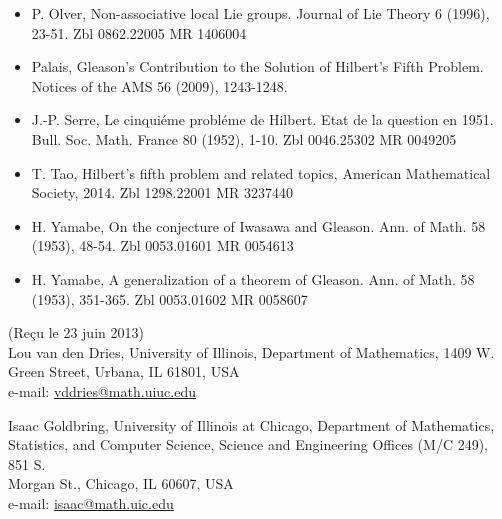 \documentclass[10pt]{article}
\begin{document}
\begin{itemize}
  \item[] [17] P. Olver, Non-associative local Lie groups. Journal of Lie Theory 6 (1996), 23-51. Zbl 0862.22005 MR 1406004
  \item[] [18] Palais, Gleason's Contribution to the Solution of Hilbert's Fifth Problem. Notices of the AMS 56 (2009), 1243-1248.
  \item[] [19] J.-P. Serre, Le cinquiéme probléme de Hilbert. Etat de la question en 1951. Bull. Soc. Math. France 80 (1952), 1-10. Zbl 0046.25302 MR 0049205
  \item[] [20] T. Tao, Hilbert's fifth problem and related topics, American Mathematical Society, 2014. Zbl 1298.22001 MR 3237440
  \item[] [21] H. Yamabe, On the conjecture of Iwasawa and Gleason. Ann. of Math. 58 (1953), 48-54. Zbl 0053.01601 MR 0054613
  \item[] [22] H. Yamabe, A generalization of a theorem of Gleason. Ann. of Math. 58 (1953), 351-365. Zbl 0053.01602 MR 0058607
\end{itemize}

(Reçu le 23 juin 2013)\\
Lou van den Dries, University of Illinois, Department of Mathematics, 1409 W.\\
Green Street, Urbana, IL 61801, USA\\
e-mail: \href{mailto:vddries@math.uiuc.edu}{vddries@math.uiuc.edu}

Isaac Goldbring, University of Illinois at Chicago, Department of Mathematics, Statistics, and Computer Science, Science and Engineering Offices (M/C 249), 851 S.\\
Morgan St., Chicago, IL 60607, USA\\
e-mail: \href{mailto:isaac@math.uic.edu}{isaac@math.uic.edu}
\end{document}

